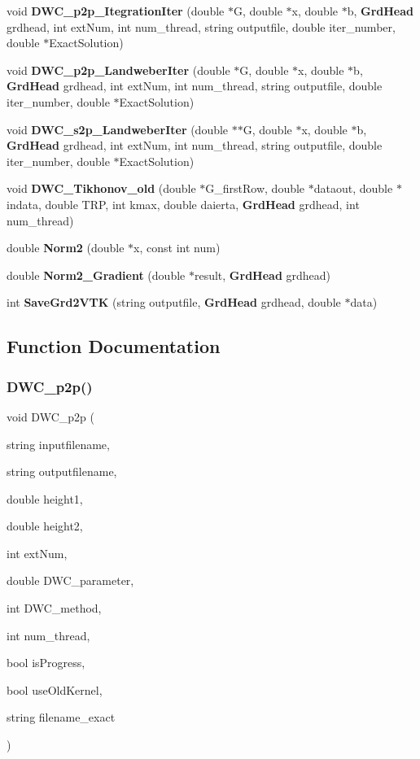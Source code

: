 \begin{DoxyCompactItemize}
\item 
void \textbf{ D\+W\+C\+\_\+p2p\+\_\+\+Itegration\+Iter} (double $\ast$G, double $\ast$x, double $\ast$b, \textbf{ Grd\+Head} grdhead, int ext\+Num, int num\+\_\+thread, string outputfile, double iter\+\_\+number, double $\ast$Exact\+Solution)
\item 
void \textbf{ D\+W\+C\+\_\+p2p\+\_\+\+Landweber\+Iter} (double $\ast$G, double $\ast$x, double $\ast$b, \textbf{ Grd\+Head} grdhead, int ext\+Num, int num\+\_\+thread, string outputfile, double iter\+\_\+number, double $\ast$Exact\+Solution)
\item 
void \textbf{ D\+W\+C\+\_\+s2p\+\_\+\+Landweber\+Iter} (double $\ast$$\ast$G, double $\ast$x, double $\ast$b, \textbf{ Grd\+Head} grdhead, int ext\+Num, int num\+\_\+thread, string outputfile, double iter\+\_\+number, double $\ast$Exact\+Solution)
\item 
void \textbf{ D\+W\+C\+\_\+\+Tikhonov\+\_\+old} (double $\ast$G\+\_\+first\+Row, double $\ast$dataout, double $\ast$indata, double T\+RP, int kmax, double daierta, \textbf{ Grd\+Head} grdhead, int num\+\_\+thread)
\item 
double \textbf{ Norm2} (double $\ast$x, const int num)
\item 
double \textbf{ Norm2\+\_\+\+Gradient} (double $\ast$result, \textbf{ Grd\+Head} grdhead)
\item 
int \textbf{ Save\+Grd2\+V\+TK} (string outputfile, \textbf{ Grd\+Head} grdhead, double $\ast$data)
\end{DoxyCompactItemize}


\subsection{Function Documentation}
\mbox{\label{Conti2D_8cpp_ab87ce573de93575b7ece2e4f772e03fd_ab87ce573de93575b7ece2e4f772e03fd}} 
\subsubsection{D\+W\+C\+\_\+p2p()}
{\footnotesize\ttfamily void D\+W\+C\+\_\+p2p (\begin{DoxyParamCaption}\item[{string}]{inputfilename,  }\item[{string}]{outputfilename,  }\item[{double}]{height1,  }\item[{double}]{height2,  }\item[{int}]{ext\+Num,  }\item[{double}]{D\+W\+C\+\_\+parameter,  }\item[{int}]{D\+W\+C\+\_\+method,  }\item[{int}]{num\+\_\+thread,  }\item[{bool}]{is\+Progress,  }\item[{bool}]{use\+Old\+Kernel,  }\item[{string}]{filename\+\_\+exact }\end{DoxyParamCaption})}



